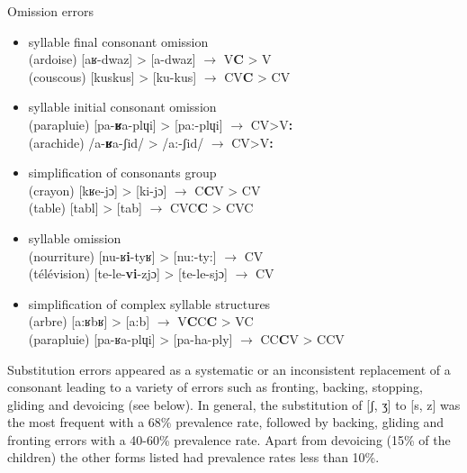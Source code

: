 \documentclass[output=paper,newtxmath,modfonts,nonflat,draftmode]{langsci/langscibook}
\begin{document}
\begin{exe}
\ex Omission errors \label{ex:takam:omission_errors}
\begin{itemize}
\item {syllable final consonant omission}\\
(ardoise) [aʁ-dwaz] > [a-dwaz] $\rightarrow$ V\textbf{C} > V\\
(couscous) [kuskus] > [ku-kus] $\rightarrow$ CV\textbf{C} > CV\\

\item {syllable initial consonant omission}\\
(parapluie) [pa-\textbf{ʁ}a-plɥi] > [pa:-plɥi] $\rightarrow$ CV>V\textbf{:}\\
(arachide) /a-\textbf{ʁ}a-ʃid/ >  /a:-ʃid/ $\rightarrow$ CV>V\textbf{:}\\

\item {simplification of consonants group}\\
(crayon) [kʁe-jɔ] > [ki-jɔ] $\rightarrow$ C\textbf{C}V > CV\\
(table)  [tabl] > [tab] $\rightarrow$ CVC\textbf{C} > CVC\\

\item {syllable omission}\\
(nourriture) [nu-ʁ\textbf{i}-tyʁ] > [nu:-ty:] $\rightarrow$ CV\\
(télévision) [te-le-\textbf{vi}-zjɔ] > [te-le-sjɔ] $\rightarrow$ CV\\

\item {simplification of complex syllable structures}\\ 
(arbre)  [a:ʁbʁ] > [a:b] $\rightarrow$ V\textbf{C}C\textbf{C} > VC\\
(parapluie) [pa-ʁa-plɥi] > [pa-ha-ply] $\rightarrow$ CC\textbf{C}V > CCV\\
\end{itemize}
\end{exe}

Substitution errors appeared as a systematic or an inconsistent replacement of a consonant leading to a variety of errors such as fronting, backing, stopping, gliding and devoicing (see  below). In general, the substitution of [ʃ, ʒ] to [s, z] was the most frequent with a 68\% prevalence rate, followed by backing, gliding and fronting errors with a 40-60\% prevalence rate. Apart from devoicing (15\% of the children) the other forms listed had prevalence rates less than 10\%.
\end{document}
